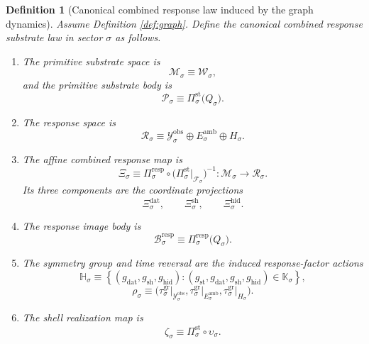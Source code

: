 \documentclass[11pt]{article}
\newcommand{\DataSpace}[1]{\mathcal Y_{#1}^{\mathrm{obs}}}
\newcommand{\AmbientTarget}[1]{E_{#1}^{\mathrm{amb}}}
\newcommand{\ProtoSpace}[1]{\mathcal M_{#1}}
\newcommand{\ProtoBody}[1]{\mathcal P_{#1}}
\newcommand{\ResponseSpace}[1]{\mathcal R_{#1}}
\newcommand{\ResponseMap}[1]{\Xi_{#1}}
\newcommand{\ResponseData}[1]{\Xi_{#1}^{\mathrm{dat}}}
\newcommand{\ResponseShell}[1]{\Xi_{#1}^{\mathrm{sh}}}
\newcommand{\ResponseHidden}[1]{\Xi_{#1}^{\mathrm{hid}}}
\newcommand{\ResponseImage}[1]{\mathcal B_{#1}^{\mathrm{resp}}}
\newcommand{\GapSpace}[1]{H_{#1}}
\newcommand{\ResponseSym}[1]{\mathbb H_{#1}}
\newcommand{\ResponseTime}[1]{\rho_{#1}}
\newcommand{\ProtoEmbed}[1]{\zeta_{#1}}
\newcommand{\GraphState}[1]{\mathcal W_{#1}}
\newcommand{\GraphAffine}[1]{\mathcal F_{#1}}
\newcommand{\GraphBody}[1]{Q_{#1}}
\newcommand{\StateProj}[1]{\Pi_{#1}^{\mathrm{st}}}
\newcommand{\RespProj}[1]{\Pi_{#1}^{\mathrm{resp}}}
\newcommand{\GraphSym}[1]{\mathbb K_{#1}}
\newcommand{\GraphTime}[1]{\tau_{#1}^{\mathrm{gr}}}
\newcommand{\GraphEmbed}[1]{\upsilon_{#1}}
\newtheorem{definition}{Definition}
\begin{document}
\begin{definition}[Canonical combined response law induced by the graph dynamics]
\label{def:canonical}
Assume Definition \ref{def:graph}. Define the canonical combined response substrate law in sector \(\sigma\) as follows.
\begin{enumerate}
    \item The primitive substrate space is
    \[
    \ProtoSpace{\sigma}\equiv \GraphState{\sigma},
    \]
    and the primitive substrate body is
    \begin{equation}
    \ProtoBody{\sigma}
    \equiv
    \StateProj{\sigma}\bigl(\GraphBody{\sigma}\bigr).
    \label{eq:bodydef}
    \end{equation}
    \item The response space is
    \[
    \ResponseSpace{\sigma}
    \equiv
    \DataSpace{\sigma}\oplus \AmbientTarget{\sigma}\oplus \GapSpace{\sigma}.
    \]
    \item The affine combined response map is
    \begin{equation}
    \ResponseMap{\sigma}
    \equiv
    \RespProj{\sigma}\circ
    \bigl(\StateProj{\sigma}\big|_{\GraphAffine{\sigma}}\bigr)^{-1}:
    \ProtoSpace{\sigma}\to \ResponseSpace{\sigma}.
    \label{eq:mapdef}
    \end{equation}
    Its three components are the coordinate projections
    \[
    \ResponseData{\sigma},
    \qquad
    \ResponseShell{\sigma},
    \qquad
    \ResponseHidden{\sigma}.
    \]
    \item The response image body is
    \begin{equation}
    \ResponseImage{\sigma}
    \equiv
    \RespProj{\sigma}\bigl(\GraphBody{\sigma}\bigr).
    \label{eq:imagedef}
    \end{equation}
    \item The symmetry group and time reversal are the induced response-factor actions
    \[
    \ResponseSym{\sigma}
    \equiv
    \left\{
    (g_{\mathrm{dat}},g_{\mathrm{sh}},g_{\mathrm{hid}}):
    (g_{\mathrm{st}},g_{\mathrm{dat}},g_{\mathrm{sh}},g_{\mathrm{hid}})
    \in \GraphSym{\sigma}
    \right\},
    \]
    \[
    \ResponseTime{\sigma}
    \equiv
    \bigl(
    \GraphTime{\sigma}\big|_{\DataSpace{\sigma}},
    \GraphTime{\sigma}\big|_{\AmbientTarget{\sigma}},
    \GraphTime{\sigma}\big|_{\GapSpace{\sigma}}
    \bigr).
    \]
    \item The shell realization map is
    \begin{equation}
    \ProtoEmbed{\sigma}
    \equiv
    \StateProj{\sigma}\circ \GraphEmbed{\sigma}.
    \label{eq:protoembeddef}
    \end{equation}
\end{enumerate}
\end{definition}
\end{document}
